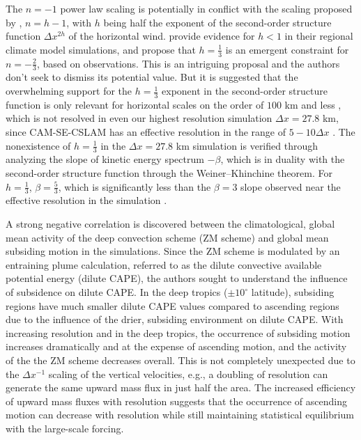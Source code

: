 \documentclass[times]{qjrms4}
\begin{document}
The $n=-1$ power law scaling is potentially in conflict with the scaling proposed by \cite{RETAL2016CD}, $n=h-1$, with $h$ being half the exponent of the second-order structure function $\Delta x^{2h}$ of the horizontal wind. \cite{RETAL2016CD} provide evidence for $h<1$ in their regional climate model simulations, and propose that $h=\frac{1}{3}$ is an emergent constraint for $n=-\frac{2}{3}$, based on observations. This is an intriguing proposal and the authors don't seek to dismiss its potential value. But it is suggested that the overwhelming support for the $h=\frac{1}{3}$ exponent in the second-order structure function is only relevant for horizontal scales on the order of $100$ km and less \citep{L1999JFM,CL2001JGR}, which is not resolved in even our highest resolution simulation $\Delta x=27.8$ km, since CAM-SE-CSLAM has an effective resolution in the range of $5-10\Delta x$ \citep{HETAL2019JAMES}. The nonexistence of $h=\frac{1}{3}$ in the $\Delta x=27.8$ km simulation is verified through analyzing the slope of kinetic energy spectrum $-\beta$, which is in duality with the second-order structure function through the Weiner–Khinchine theorem. For $h=\frac{1}{3}$, $\beta=\frac{5}{3}$, which is significantly less than the $\beta=3$ slope observed near the effective resolution in the simulation {\color{red}{(Figure~X)}}.

A strong negative correlation is discovered between the climatological, global mean activity of the \cite{ZM1995AO} deep convection scheme (ZM scheme) and global mean subsiding motion in the simulations. Since the ZM scheme is modulated by an entraining plume calculation, referred to as the dilute convective available potential energy (dilute CAPE), the authors sought to understand the influence of subsidence on dilute CAPE. In the deep tropics ($\pm 10^{\circ}$ latitude), subsiding regions have much smaller dilute CAPE values compared to ascending regions due to the influence of the drier, subsiding environment on dilute CAPE. With increasing resolution and in the deep tropics, the occurrence of subsiding motion increases dramatically and at the expense of ascending motion, and the activity of the the ZM scheme decreases overall. This is not completely unexpected due to the $\Delta x^{-1}$ scaling of the vertical velocities, e.g., a doubling of resolution can generate the same upward mass flux in just half the area. The increased efficiency of upward mass fluxes with resolution suggests that the occurrence of ascending motion can decrease with resolution while still maintaining statistical equilibrium with the large-scale forcing.
\end{document}
